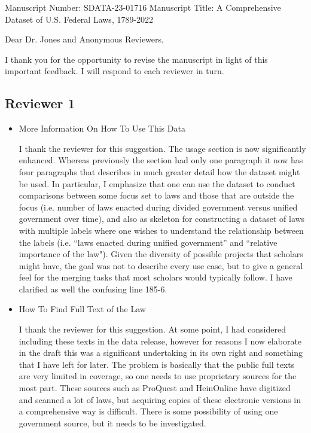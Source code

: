 \documentclass{article}
\begin{document}
\flushleft
\noindent Manuscript Number: SDATA-23-01716 \newline
\noindent Manuscript Title: A Comprehensive Dataset of U.S. Federal Laws, 1789-2022  \newline 

Dear Dr. Jones and Anonymous Reviewers,

I thank you for the opportunity to revise the manuscript in light of this important feedback. I will respond to each reviewer in turn.

\subsection*{Reviewer 1}

\begin{itemize}

\item More Information On How To Use This Data

I thank the reviewer for this suggestion. The usage section is now significantly enhanced. Whereas previously the section had only one paragraph it now has four paragraphs that describes in much greater detail how the dataset might be used. In particular, I emphasize that one can use the dataset to conduct comparisons between some focus set to laws and those that are outside the focus (i.e. number of laws enacted during divided government versus unified government over time), and also as skeleton for constructing a dataset of laws with multiple labels where one wishes to understand the relationship between the labels (i.e. ``laws enacted during unified government'' and ``relative importance of the law"). Given the diversity of possible projects that scholars might have, the goal was not to describe every use case, but to give a general feel for the merging tasks that most scholars would typically follow.  I have clarified as well the confusing line 185-6.

\item How To Find Full Text of the Law

I thank the reviewer for this suggestion. At some point, I had considered including these texts in the data release, however for reasons I now elaborate in the draft this was a significant undertaking in its own right and something that I have left for later. The problem is basically that the public full texts are very limited in coverage, so one needs to use proprietary sources for the most part. These sources such as ProQuest and HeinOnline have digitized and scanned a lot of laws, but acquiring copies of these electronic versions in a comprehensive way is difficult. There is some possibility of using one government source, but it needs to be investigated.


\end{itemize}
\end{document}
